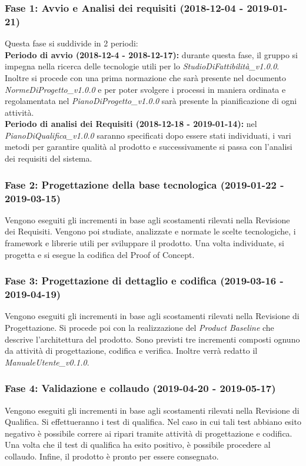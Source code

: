 \subsubsection{Fase 1: Avvio e Analisi dei requisiti (2018-12-04 - 2019-01-21)} 
Questa fase si suddivide in 2 periodi: \\
\textbf{Periodo di avvio (2018-12-4 - 2018-12-17):} 
durante questa fase, il gruppo si impegna nella ricerca delle tecnologie utili per lo \textit{StudioDiFattibilità\_v1.0.0}. Inoltre si procede con una prima normazione che sarà presente nel documento \textit{NormeDiProgetto\_v1.0.0} e per poter svolgere i processi in maniera ordinata e regolamentata nel \textit{PianoDiProgetto\_v1.0.0} sarà presente la pianificazione di ogni attività.\\
\textbf{Periodo di analisi dei Requisiti (2018-12-18 - 2019-01-14):} nel \textit{PianoDiQualifica\_v1.0.0} saranno specificati dopo essere stati individuati, i vari metodi per garantire qualità al prodotto e successivamente si passa con l'analisi dei requisiti del sistema.

\subsubsection{Fase 2: Progettazione della base tecnologica (2019-01-22 - 2019-03-15)}
Vengono eseguiti gli incrementi in base agli scostamenti rilevati nella Revisione dei Requisiti.
Vengono poi studiate, analizzate e normate le scelte tecnologiche, i framework e librerie utili per sviluppare il prodotto. Una volta individuate, si progetta e si esegue la codifica del Proof of Concept.\\

\subsubsection{Fase 3: Progettazione di dettaglio e codifica (2019-03-16 - 2019-04-19)}
Vengono eseguiti gli incrementi in base agli scostamenti rilevati nella Revisione di Progettazione.
Si procede poi con la realizzazione del \textit{Product Baseline} che descrive l'architettura del prodotto.
Sono previsti tre incrementi composti ognuno da attività di progettazione, codifica e verifica.
Inoltre verrà redatto il \textit{ManualeUtente\_v0.1.0}.\\

\subsubsection{Fase 4: Validazione e collaudo (2019-04-20 - 2019-05-17)}
Vengono eseguiti gli incrementi in base agli scostamenti rilevati nella Revisione di Qualifica.
Si effettueranno i test di qualifica. Nel caso in cui tali test abbiano esito negativo è possibile correre ai ripari tramite attività di progettazione e codifica. Una volta che il test di qualifica ha esito positivo, è possibile procedere al collaudo.
Infine, il prodotto è pronto per essere consegnato.

